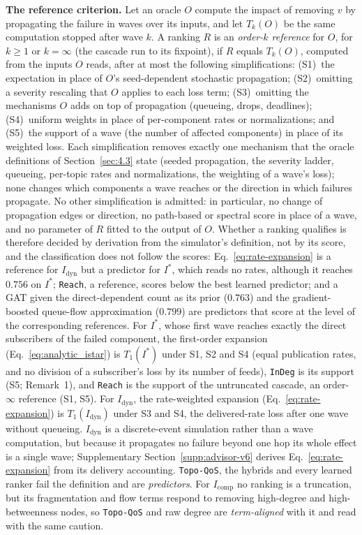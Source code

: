 \documentclass[preprint,3p]{elsarticle}
\begin{document}
\noindent\textbf{The reference criterion.} Let an oracle $O$ compute the impact of removing $v$ by propagating the failure in waves over its inputs, and let $T_k(O)$ be the same computation stopped after wave $k$. A ranking $R$ is an \emph{order-$k$ reference} for $O$, for $k \ge 1$ or $k = \infty$ (the cascade run to its fixpoint), if $R$ equals $T_k(O)$, computed from the inputs $O$ reads, after at most the following simplifications: (S1)~the expectation in place of $O$'s seed-dependent stochastic propagation; (S2)~omitting a severity rescaling that $O$ applies to each loss term; (S3)~omitting the mechanisms $O$ adds on top of propagation (queueing, drops, deadlines); (S4)~uniform weights in place of per-component rates or normalizations; and (S5)~the support of a wave (the number of affected components) in place of its weighted loss. Each simplification removes exactly one mechanism that the oracle definitions of Section~\ref{sec:4.3} state (seeded propagation, the severity ladder, queueing, per-topic rates and normalizations, the weighting of a wave's loss); none changes which components a wave reaches or the direction in which failures propagate. No other simplification is admitted: in particular, no change of propagation edges or direction, no path-based or spectral score in place of a wave, and no parameter of $R$ fitted to the output of $O$. Whether a ranking qualifies is therefore decided by derivation from the simulator's definition, not by its score, and the classification does not follow the scores: Eq.~\eqref{eq:rate-expansion} is a reference for $I_{\text{dyn}}$ but a predictor for $I^*$, which reads no rates, although it reaches $0.756$ on $I^*$; \texttt{Reach}, a reference, scores below the best learned predictor; and a GAT given the direct-dependent count as its prior ($0.763$) and the gradient-boosted queue-flow approximation ($0.799$) are predictors that score at the level of the corresponding references. For $I^*$, whose first wave reaches exactly the direct subscribers of the failed component, the first-order expansion (Eq.~\eqref{eq:analytic_istar}) is $T_1(I^*)$ under S1, S2 and S4 (equal publication rates, and no division of a subscriber's loss by its number of feeds), \texttt{InDeg} is its support (S5; Remark~1), and \texttt{Reach} is the support of the untruncated cascade, an order-$\infty$ reference (S1, S5). For $I_{\text{dyn}}$, the rate-weighted expansion (Eq.~\eqref{eq:rate-expansion}) is $T_1(I_{\text{dyn}})$ under S3 and S4, the delivered-rate loss after one wave without queueing. $I_{\text{dyn}}$ is a discrete-event simulation rather than a wave computation, but because it propagates no failure beyond one hop its whole effect is a single wave; Supplementary Section~\ref{supp:advisor-v6} derives Eq.~\eqref{eq:rate-expansion} from its delivery accounting. \texttt{Topo-QoS}, the hybrids and every learned ranker fail the definition and are \emph{predictors}. For $I_{\text{comp}}$ no ranking is a truncation, but its fragmentation and flow terms respond to removing high-degree and high-betweenness nodes, so \texttt{Topo-QoS} and raw degree are \emph{term-aligned} with it and read with the same caution.
\end{document}
